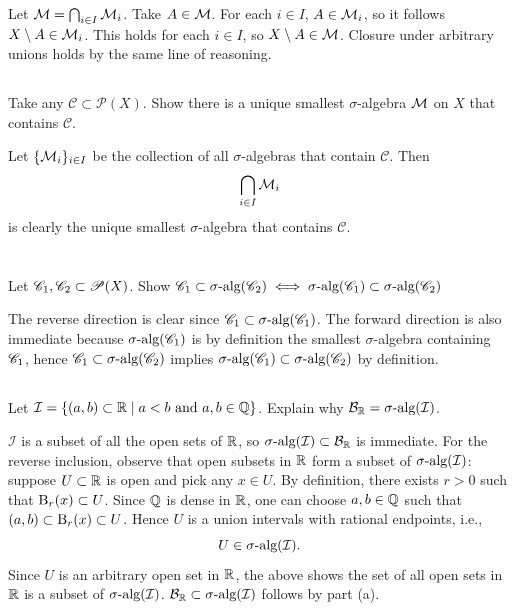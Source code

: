 \documentclass[12pt]{article}
\begin{document}
\noindent\dotfill 

Let $\mathcal{M} = \bigcap_{i \in I} \mathcal{M}_i$. 
Take $A \in \mathcal{M}$. 
For each $i \in I$, $A \in \mathcal{M}_i$, so it follows $X \setminus A \in \mathcal{M}_i$. 
This holds for each $i \in I$, so $X \setminus A \in \mathcal{M}$. 
Closure under arbitrary unions holds by the same line of reasoning. 

\subsection{} 
Take any $\mathscr{C} \subset \mathscr{P}(X)$. 
Show there is a unique smallest $\sigma$-algebra $\mathcal{M}$ on $X$ that contains $\mathscr{C}$. 

\noindent\dotfill

Let $\{\mathcal{M}_i\}_{i \in I}$ be the collection of all $\sigma$-algebras that contain $\mathscr{C}$. 
Then 
$$\bigcap_{i \in I}\mathcal{M}_i$$
is clearly the unique smallest $\sigma$-algebra that contains $\mathscr{C}$. 

\section{} 
\subsection{} 
Let $\mathscr{C}_1, \mathscr{C}_2 \subset \mathscr{P}(X)$. 
Show $\mathscr{C}_1 \subset \sigma\text{-alg}(\mathscr{C}_2) \iff \sigma\text{-alg}(\mathscr{C}_1) \subset \sigma\text{-alg}(\mathscr{C}_2)$ 

\noindent\dotfill 

The reverse direction is clear since $\mathscr{C}_1 \subset \sigma\text{-alg}(\mathscr{C}_1)$. 
The forward direction is also immediate because $\sigma\text{-alg}(\mathscr{C}_1)$ is by definition the smallest $\sigma$-algebra containing $\mathscr{C}_1$, hence $\mathscr{C}_1 \subset \sigma\text{-alg}(\mathscr{C}_2)$ implies $\sigma\text{-alg}(\mathscr{C}_1) \subset \sigma\text{-alg}(\mathscr{C}_2)$ by definition. 

\subsection{} 
Let $\mathcal{I} = \{(a, b) \subset \mathbb{R} \mid a < b \text{ and } a, b \in \mathbb{Q}\}$. 
Explain why $\mathcal{B}_{\mathbb{R}} = \sigma\text{-alg}(\mathcal{I})$. 

\noindent\dotfill 

$\mathcal{I}$ is a subset of all the open sets of $\mathbb{R}$, so $\sigma\text{-alg}(\mathcal{I}) \subset \mathcal{B}_{\mathbb{R}}$ is immediate. 
For the reverse inclusion, observe that open subsets in $\mathbb{R}$ form a subset of $\sigma\text{-alg}(\mathcal{I})$: 
suppose $U \subset \mathbb{R}$ is open and pick any $x \in U$. 
By definition, there exists $r > 0$ such that $\text{B}_{r}(x) \subset U$. 
Since $\mathbb{Q}$ is dense in $\mathbb{R}$, one can choose $a, b \in \mathbb{Q}$ such that $(a, b) \subset \text{B}_{r}(x) \subset U$. 
Hence $U$ is a union intervals with rational endpoints, i.e., 
$$U \in \sigma\text{-alg}(\mathcal{I}).$$
Since $U$ is an arbitrary open set in $\mathbb{R}$, the above shows the set of all open sets in $\mathbb{R}$ is a subset of $\sigma\text{-alg}(\mathcal{I})$. 
$\mathcal{B}_{\mathbb{R}} \subset \sigma\text{-alg}(\mathcal{I})$ follows by part (a). 
\end{document}
